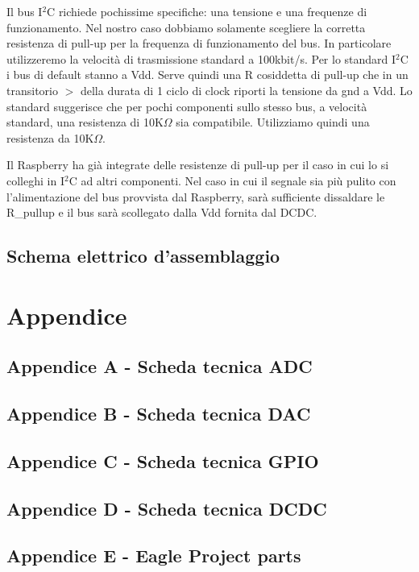 \documentclass[10pt]{article}
\begin{document}
		Il bus I\(^2\)C richiede pochissime specifiche: una tensione e una frequenze di funzionamento.
		Nel nostro caso dobbiamo solamente scegliere la corretta resistenza di pull-up per la frequenza di funzionamento del bus.
		In particolare utilizzeremo la velocità di trasmissione standard a 100kbit/s.
		Per lo standard I\(^2\)C i bus di default stanno a Vdd. Serve quindi una R cosiddetta di pull-up che in un transitorio \(>\) della durata di 1 ciclo di clock riporti la tensione da gnd a Vdd.
		Lo standard suggerisce che per pochi componenti sullo stesso bus, a velocità standard, una resistenza di 10K\(\Omega\) sia compatibile.
		Utilizziamo quindi una resistenza da 10K\(\Omega\).

		Il Raspberry ha già integrate delle resistenze di pull-up per il caso in cui lo si colleghi in I\(^2\)C ad altri componenti.
		Nel caso in cui il segnale sia più pulito con l'alimentazione del bus provvista dal Raspberry, sarà sufficiente dissaldare le R\_pullup e il bus sarà scollegato dalla Vdd fornita dal DCDC.

\newpage
{}
	\subsection{Schema elettrico d'assemblaggio}
	\begin{figure}[h!]
		
	\end{figure}
\restoregeometry

\section{Appendice}
\subsection{Appendice A - Scheda tecnica ADC}
		
		
\newpage
\subsection{Appendice B - Scheda tecnica DAC}
		
		
\newpage
\subsection{Appendice C - Scheda tecnica GPIO}
	
	
\newpage
\subsection{Appendice D - Scheda tecnica DCDC}
	
	
\newpage
\subsection{Appendice E - Eagle Project parts}
	
\end{document}
